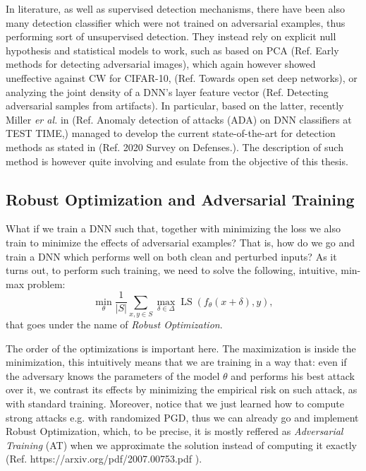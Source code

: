 \documentclass[LaM,binding=0.6cm]{./packages/sapthesis/sapthesis}
\begin{document}
            In literature, as well as supervised detection mechanisms, there have been also many 
            detection classifier which were not trained on adversarial examples, thus performing sort of unsupervised detection.
            They instead rely on explicit null hypothesis and statistical models to work, such as based on PCA (Ref. Early methods for
            detecting adversarial images), which again however showed uneffective against CW for CIFAR-10, (Ref. Towards open set
            deep networks), or analyzing the joint density of a DNN's layer feature vector (Ref. Detecting adversarial samples from artifacts).
            In particular, based on the latter, recently Miller \textit{er al.} in (Ref. Anomaly
            detection of attacks (ADA) on DNN classifiers at TEST TIME,) managed to develop the current state-of-the-art for detection
            methods as stated in (Ref. 2020 Survey on Defenses.). The description of such method is however quite involving and esulate from
            the objective of this thesis.
            
            
            \subsection{Robust Optimization and Adversarial Training}

                What if we train a DNN such that, together with minimizing the loss we also
                train to minimize the effects of adversarial examples? That is, how do we go and train
                a DNN which performs well on both clean and perturbed inputs? As it turns out, to perform
                such training, we need to solve the following, intuitive, min-max problem:
                \begin{equation}
                    \label{robopt}
                    \underset{\theta}{\operatorname{min}} \frac{1}{|S|} \sum_{x, y \in S} \max _{\delta \in \Delta} \operatorname{LS}\left(f_{\theta}(x+\delta), y\right),
                \end{equation}
                that goes under the name of \textit{Robust Optimization}.
                
                The order of the optimizations is important here. The maximization is inside the minimization, this
                intuitively means that we are training in a way that: even if the adversary knows the 
                parameters of the model $\theta$ and performs his best attack over it, we contrast
                its effects by minimizing the empirical risk on such attack, as with standard training.
                Moreover, notice that we just learned how to compute strong attacks e.g. with randomized PGD, thus we
                can already go and implement Robust Optimization, which, to be precise, it is mostly reffered as \textit{Adversarial
                Training} (AT) when we approximate the solution instead of computing it exactly (Ref. https://arxiv.org/pdf/2007.00753.pdf ).
\end{document}
